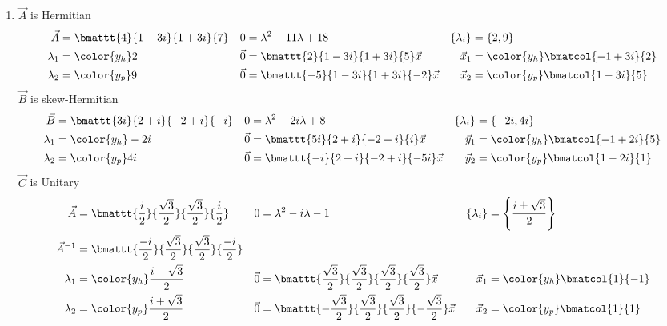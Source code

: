 \begin{enumerate}
    \item $\vec{A}$ is Hermitian
          \begin{align}
              \vec{A}       & = \bmattt{4}{1-3i}{1+3i}{7}               &
              0             & = \lambda^2 - 11\lambda + 18              &
              \{\lambda_i\} & = \{2, 9\}                                  \\
              \lambda_1     & = \color{y_h} 2                           &
              \vec{0}       & = \bmattt{2}{1 - 3i}{1 + 3i}{5} \vec{x}   &
              \vec{x}_1     & = \color{y_h} \bmatcol{-1 + 3i}{2}          \\
              \lambda_2     & = \color{y_p} 9                           &
              \vec{0}       & = \bmattt{-5}{1 - 3i}{1 + 3i}{-2} \vec{x} &
              \vec{x}_2     & = \color{y_p} \bmatcol{1 - 3i}{5}
          \end{align}
          $\vec{B}$ is skew-Hermitian
          \begin{align}
              \vec{B}       & = \bmattt{3i}{2+i}{-2+i}{-i}          &
              0             & = \lambda^2 - 2i\lambda + 8           &
              \{\lambda_i\} & = \{-2i, 4i\}                           \\
              \lambda_1     & = \color{y_h} -2i                     &
              \vec{0}       & = \bmattt{5i}{2+i}{-2+i}{i} \vec{x}   &
              \vec{y}_1     & = \color{y_h} \bmatcol{-1 + 2i}{5}      \\
              \lambda_2     & = \color{y_p} 4i                      &
              \vec{0}       & = \bmattt{-i}{2+i}{-2+i}{-5i} \vec{x} &
              \vec{y}_2     & = \color{y_p} \bmatcol{1 - 2i}{1}
          \end{align}
          $\vec{C}$ is Unitary
          \begin{align}
              \vec{A}       & = \bmattt{\frac{i}{2}}{\frac{\sqrt{3}}{2}}
              {\frac{\sqrt{3}}{2}}
              {\frac{i}{2}} &
              0             & = \lambda^2 - i\lambda - 1                         &
              \{\lambda_i\} & = \Bigg\{\frac{i \pm \sqrt{3}}{2}\Bigg\}             \\
              \vec{A}^{-1}  & = \bmattt{\frac{-i}{2}}{\frac{\sqrt{3}}{2}}
              {\frac{\sqrt{3}}{2}}{\frac{-i}{2}}                                   \\
              \lambda_1     & = \color{y_h} \frac{i - \sqrt{3}}{2}               &
              \vec{0}       & = \bmattt{\frac{\sqrt{3}}{2}}{\frac{\sqrt{3}}{2}}
              {\frac{\sqrt{3}}{2}}{\frac{\sqrt{3}}{2}}
              \vec{x}       &
              \vec{x}_1     & = \color{y_h} \bmatcol{1}{-1}                        \\
              \lambda_2     & = \color{y_p} \frac{i + \sqrt{3}}{2}               &
              \vec{0}       & = \bmattt{-\frac{\sqrt{3}}{2}}{\frac{\sqrt{3}}{2}}
              {\frac{\sqrt{3}}{2}}{-\frac{\sqrt{3}}{2}}
              \vec{x}       &
              \vec{x}_2     & = \color{y_p} \bmatcol{1}{1}
          \end{align}


\end{enumerate}
